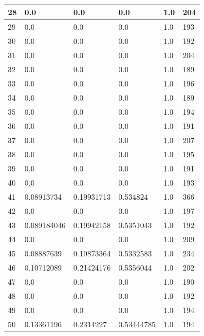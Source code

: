 \begin{longtable}{|l|l|l|l|l|l|}
28 & 0.0 & 0.0 & 0.0 & 1.0 & 204 \\ \hline 
29 & 0.0 & 0.0 & 0.0 & 1.0 & 193 \\ \hline 
30 & 0.0 & 0.0 & 0.0 & 1.0 & 192 \\ \hline 
31 & 0.0 & 0.0 & 0.0 & 1.0 & 204 \\ \hline 
32 & 0.0 & 0.0 & 0.0 & 1.0 & 189 \\ \hline 
33 & 0.0 & 0.0 & 0.0 & 1.0 & 196 \\ \hline 
34 & 0.0 & 0.0 & 0.0 & 1.0 & 189 \\ \hline 
35 & 0.0 & 0.0 & 0.0 & 1.0 & 194 \\ \hline 
36 & 0.0 & 0.0 & 0.0 & 1.0 & 191 \\ \hline 
37 & 0.0 & 0.0 & 0.0 & 1.0 & 207 \\ \hline 
38 & 0.0 & 0.0 & 0.0 & 1.0 & 195 \\ \hline 
39 & 0.0 & 0.0 & 0.0 & 1.0 & 191 \\ \hline 
40 & 0.0 & 0.0 & 0.0 & 1.0 & 193 \\ \hline 
41 & 0.08913734 & 0.19931713 & 0.534824 & 1.0 & 366 \\ \hline 
42 & 0.0 & 0.0 & 0.0 & 1.0 & 197 \\ \hline 
43 & 0.089184046 & 0.19942158 & 0.5351043 & 1.0 & 192 \\ \hline 
44 & 0.0 & 0.0 & 0.0 & 1.0 & 209 \\ \hline 
45 & 0.08887639 & 0.19873364 & 0.5332583 & 1.0 & 234 \\ \hline 
46 & 0.10712089 & 0.21424176 & 0.5356044 & 1.0 & 202 \\ \hline 
47 & 0.0 & 0.0 & 0.0 & 1.0 & 190 \\ \hline 
48 & 0.0 & 0.0 & 0.0 & 1.0 & 192 \\ \hline 
49 & 0.0 & 0.0 & 0.0 & 1.0 & 194 \\ \hline 
50 & 0.13361196 & 0.2314227 & 0.53444785 & 1.0 & 194 \\ \hline 
\end{longtable}